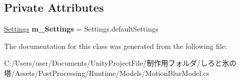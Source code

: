 \subsection*{Private Attributes}
\begin{DoxyCompactItemize}
\item 
\mbox{\label{class_unity_engine_1_1_post_processing_1_1_motion_blur_model_a13941e4b9196845b865073b202691453}} 
\hyperlink{struct_unity_engine_1_1_post_processing_1_1_motion_blur_model_1_1_settings}{Settings} {\bfseries m\+\_\+\+Settings} = Settings.\+default\+Settings
\end{DoxyCompactItemize}


The documentation for this class was generated from the following file\+:\begin{DoxyCompactItemize}
\item 
C\+:/\+Users/user/\+Documents/\+Unity\+Project\+File/制作用フォルダ/しろと氷の塔/\+Assets/\+Post\+Processing/\+Runtime/\+Models/Motion\+Blur\+Model.\+cs\end{DoxyCompactItemize}

